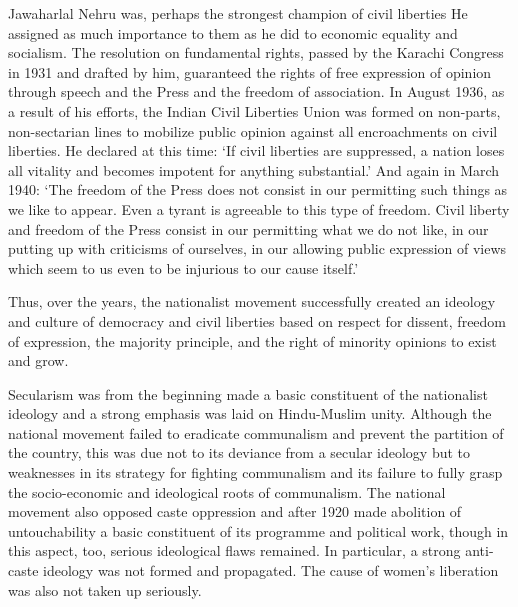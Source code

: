 Jawaharlal Nehru was, perhaps the strongest champion of civil liberties He assigned as much importance to them as he did to economic equality and socialism. The resolution on fundamental rights, passed by the Karachi Congress in 1931 and drafted by him, guaranteed the rights of free expression of opinion through speech and the Press and the freedom of association. In August 1936, as a result of his efforts, the Indian Civil Liberties Union was formed on non-parts, non-sectarian lines to mobilize public opinion against all encroachments on civil liberties. He declared at this time: `If civil liberties are suppressed, a nation loses all vitality and becomes impotent for anything substantial.' And again in March 1940: `The freedom of the Press does not consist in our permitting such things as we like to appear. Even a tyrant is agreeable to this type of freedom. Civil liberty and freedom of the Press consist in our permitting what we do not like, in our putting up with criticisms of ourselves, in our allowing public expression of views which seem to us even to be injurious to our cause itself.'

Thus, over the years, the nationalist movement successfully created an ideology and culture of democracy and civil liberties based on respect for dissent, freedom of expression, the majority principle, and the right of minority opinions to exist and grow.

Secularism was from the beginning made a basic constituent of the nationalist ideology and a strong emphasis was laid on Hindu-Muslim unity. Although the national movement failed to eradicate communalism and prevent the partition of the country, this was due not to its deviance from a secular ideology but to weaknesses in its strategy for fighting communalism and its failure to fully grasp the socio-economic and ideological roots of communalism. The national movement also opposed caste oppression and after 1920 made abolition of untouchability a basic constituent of its programme and political work, though in this aspect, too, serious ideological flaws remained. In particular, a strong anti-caste ideology was not formed and propagated. The cause of women's liberation was also not taken up seriously.

